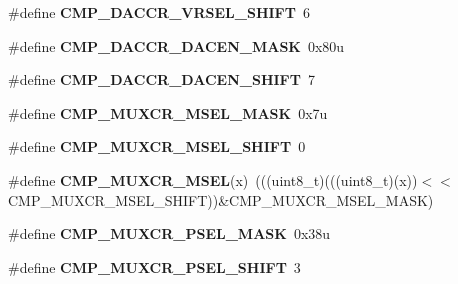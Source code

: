 \begin{DoxyCompactItemize}
\item 
\mbox{\label{group___c_m_p___register___masks_gab9f804a9c4ecafbaaa82f2fc0ec69083}} 
\#define {\bfseries C\+M\+P\+\_\+\+D\+A\+C\+C\+R\+\_\+\+V\+R\+S\+E\+L\+\_\+\+S\+H\+I\+FT}~6
\item 
\mbox{\label{group___c_m_p___register___masks_gacfd8aec2de81865d8f5fc0f06d17ba08}} 
\#define {\bfseries C\+M\+P\+\_\+\+D\+A\+C\+C\+R\+\_\+\+D\+A\+C\+E\+N\+\_\+\+M\+A\+SK}~0x80u
\item 
\mbox{\label{group___c_m_p___register___masks_ga85aa1686a0d5a7de2375bfab7167bb93}} 
\#define {\bfseries C\+M\+P\+\_\+\+D\+A\+C\+C\+R\+\_\+\+D\+A\+C\+E\+N\+\_\+\+S\+H\+I\+FT}~7
\item 
\mbox{\label{group___c_m_p___register___masks_ga6ff83366097d3be5ae93234b68684cf5}} 
\#define {\bfseries C\+M\+P\+\_\+\+M\+U\+X\+C\+R\+\_\+\+M\+S\+E\+L\+\_\+\+M\+A\+SK}~0x7u
\item 
\mbox{\label{group___c_m_p___register___masks_gad74d8206afe9b7ad009b0a7ac2bbf1cf}} 
\#define {\bfseries C\+M\+P\+\_\+\+M\+U\+X\+C\+R\+\_\+\+M\+S\+E\+L\+\_\+\+S\+H\+I\+FT}~0
\item 
\mbox{\label{group___c_m_p___register___masks_ga31028e9db6d77502d4561380ce1b12fe}} 
\#define {\bfseries C\+M\+P\+\_\+\+M\+U\+X\+C\+R\+\_\+\+M\+S\+EL}(x)~(((uint8\+\_\+t)(((uint8\+\_\+t)(x))$<$$<$C\+M\+P\+\_\+\+M\+U\+X\+C\+R\+\_\+\+M\+S\+E\+L\+\_\+\+S\+H\+I\+FT))\&C\+M\+P\+\_\+\+M\+U\+X\+C\+R\+\_\+\+M\+S\+E\+L\+\_\+\+M\+A\+SK)
\item 
\mbox{\label{group___c_m_p___register___masks_gaba9739da107b2a2b908af338d14df160}} 
\#define {\bfseries C\+M\+P\+\_\+\+M\+U\+X\+C\+R\+\_\+\+P\+S\+E\+L\+\_\+\+M\+A\+SK}~0x38u
\item 
\mbox{\label{group___c_m_p___register___masks_gab686629f56ced4b88c699f0f610dece5}} 
\#define {\bfseries C\+M\+P\+\_\+\+M\+U\+X\+C\+R\+\_\+\+P\+S\+E\+L\+\_\+\+S\+H\+I\+FT}~3
\item 
$$
\end{DoxyCompactItemize}

